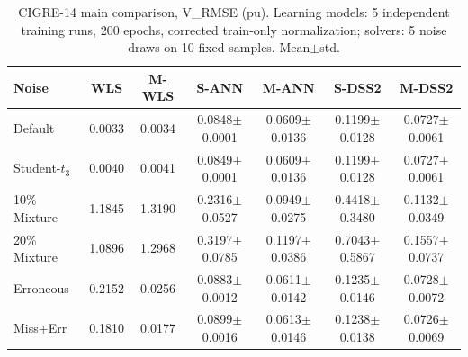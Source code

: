 \begin{table}[htbp]
\centering
\caption{CIGRE-14 main comparison, V\_RMSE (pu). Learning models: 5 independent training runs, 200 epochs, corrected train-only normalization; solvers: 5 noise draws on 10 fixed samples. Mean$\pm$std.}
\label{tab:main14}
\setlength{\tabcolsep}{4pt}
\footnotesize
\begin{tabular}{lcccccc}
\toprule
Noise & WLS & M-WLS & S-ANN & M-ANN & S-DSS2 & M-DSS2 \\
\midrule
Default & 0.0033 & 0.0034 & 0.0848$\pm$0.0001 & 0.0609$\pm$0.0136 & 0.1199$\pm$0.0128 & 0.0727$\pm$0.0061 \\
Student-$t_3$ & 0.0040 & 0.0041 & 0.0849$\pm$0.0001 & 0.0609$\pm$0.0136 & 0.1199$\pm$0.0128 & 0.0727$\pm$0.0061 \\
10\% Mixture & 1.1845 & 1.3190 & 0.2316$\pm$0.0527 & 0.0949$\pm$0.0275 & 0.4418$\pm$0.3480 & 0.1132$\pm$0.0349 \\
20\% Mixture & 1.0896 & 1.2968 & 0.3197$\pm$0.0785 & 0.1197$\pm$0.0386 & 0.7043$\pm$0.5867 & 0.1557$\pm$0.0737 \\
Erroneous & 0.2152 & 0.0256 & 0.0883$\pm$0.0012 & 0.0611$\pm$0.0142 & 0.1235$\pm$0.0146 & 0.0728$\pm$0.0072 \\
Miss+Err & 0.1810 & 0.0177 & 0.0899$\pm$0.0016 & 0.0613$\pm$0.0146 & 0.1238$\pm$0.0138 & 0.0726$\pm$0.0069 \\
\bottomrule
\end{tabular}
\end{table}
